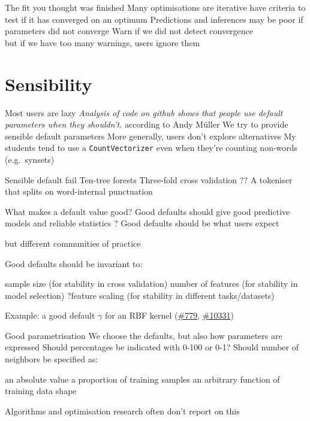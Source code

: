 \documentclass[aspectratio=169, 22pt]{beamer}
\newcommand{\issue}[1]{\href{https://github.com/scikit-learn/scikit-learn/issues/#1}{\##1}}
\begin{document}
\begin{points}{The fit you thought was finished}
	\p Many optimisations are iterative
	\p have criteria to test if it has converged on an optimum
	\p Predictions and inferences may be poor if parameters did not converge
	\p[Solution] Warn if we did not detect convergence \\
	but if we have too many warnings, users ignore them
\end{points}

\section{Sensibility}

\begin{points}{Most users are lazy}
	\p \emph{Analysis of code on github shows that people use default parameters when they shouldn't.} according to Andy M\"uller
	\p We try to provide sensible default parameters
	\vfill
	\p More generally, users don't explore alternatives
	\p My students tend to use a \verb|CountVectorizer| even when they're counting non-words (e.g.\ synsets)
\end{points}

\begin{points}{Sensible default fail}
	\p Ten-tree forests
	\p Three-fold cross validation
	\p ?? A tokeniser that splits on word-internal punctuation
\end{points}

\begin{points}{What makes a default value good?}
	\p Good defaults should give good predictive models and reliable statistics
	\p ? Good defaults should be what users expect
	\begin{itemize}
			\p but different communities of practice
	\end{itemize}
	\p Good defaults should be invariant to:
	\begin{itemize}
			\p sample size (for stability in cross validation)
			\p number of features (for stability in model selection)
			\p ?feature scaling (for stability in different tasks/datasets)
	\end{itemize}
	\p Example: a good default $\gamma$ for an RBF kernel (\issue{779}, \issue{10331})
\end{points}

\begin{points}{Good parametrisation}
	\p We choose the defaults, but also how parameters are expressed
	\vfill
	\p Should percentages be indicated with 0-100 or 0-1?
	\p Should number of neighbors be specified as:
	\begin{itemize}
		\p an absolute value
		\p a proportion of training samples
		\p an arbitrary function of training data shape
	\end{itemize}
	\vfill
	\p Algorithms and optimisation research often don't report on this
\end{points}
\end{document}
